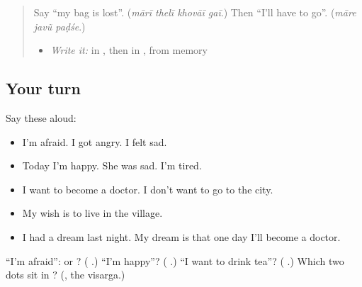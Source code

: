\label{lesson:GU-R281-feelings-and-hopes}



\begin{quote}
Say \textquotedblleft{}my bag is lost\textquotedblright{}. (\emph{mārī thelī khovāī gaī}.) Then \textquotedblleft{}I'll have to go\textquotedblright{}. (\emph{māre javũ paḍśe}.)

\begin{itemize}
\raggedright
  \item \emph{Write it:} \textbf{} in \textbf{}, then \textbf{} in \textbf{}, from memory
\end{itemize}
\end{quote}

\subsection*{Your turn}
Say these aloud:

\begin{itemize}
\raggedright
  \item I'm afraid. I got angry. I felt sad.
  \item Today I'm happy. She was sad. I'm tired.
  \item I want to become a doctor. I don't want to go to the city.
  \item My wish is to live in the village.
  \item I had a dream last night. My dream is that one day I'll become a doctor.
\end{itemize}

\begin{tcolorbox}[breakable,colback=teal!4,colframe=teal!35!black,title={Before you move on}]
\textquotedblleft{}I'm afraid\textquotedblright{}: \textbf{} or \textbf{}? (\textbf{   }.) \textquotedblleft{}I'm happy\textquotedblright{}? (\textbf{  }.) \textquotedblleft{}I want to drink tea\textquotedblright{}? (\textbf{   }.) Which two dots sit in \textbf{}? (\textbf{}, the visarga.)
\end{tcolorbox}
